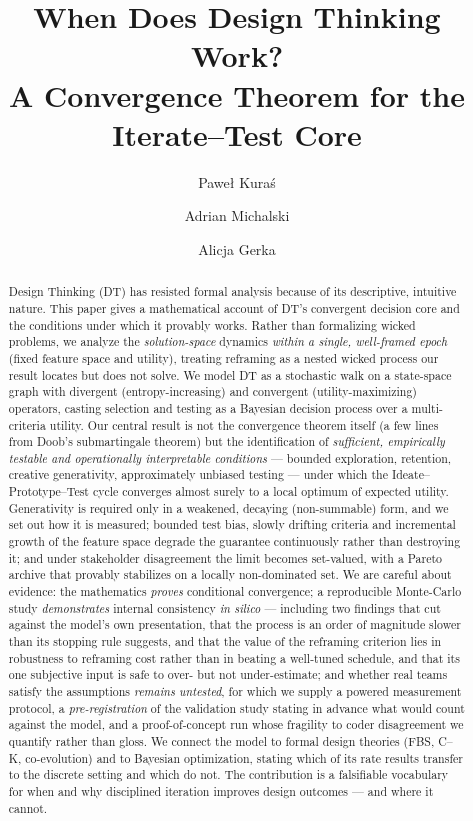 \documentclass[11pt]{article}
\title{\textbf{When Does Design Thinking Work?\\A Convergence Theorem for the Iterate--Test Core}}
\author[1]{Paweł Kuraś}
\author[2]{Adrian Michalski}
\author[3]{Alicja Gerka}
\affil[1]{Institute of Telecommunications, AGH University of Science and Technology, Kraków, Poland}
\affil[2]{Faculty of Mathematics and Applied Sciences, Rzeszów University of Technology, Rzeszów, Poland}
\affil[3]{Department of Complex Systems, Rzeszów University of Technology, Rzeszów, Poland}
\begin{document}
\maketitle

\begin{abstract}
\noindent Design Thinking (DT) has resisted formal analysis because of its descriptive, intuitive nature. This paper gives a mathematical account of DT's convergent decision core and the conditions under which it provably works. Rather than formalizing wicked problems, we analyze the \emph{solution-space} dynamics \emph{within a single, well-framed epoch} (fixed feature space and utility), treating reframing as a nested wicked process our result locates but does not solve. We model DT as a stochastic walk on a state-space graph with divergent (entropy-increasing) and convergent (utility-maximizing) operators, casting selection and testing as a Bayesian decision process over a multi-criteria utility. Our central result is not the convergence theorem itself (a few lines from Doob's submartingale theorem) but the identification of \emph{sufficient, empirically testable and operationally interpretable conditions} --- bounded exploration, retention, creative generativity, approximately unbiased testing --- under which the Ideate--Prototype--Test cycle converges almost surely to a local optimum of expected utility. Generativity is required only in a weakened, decaying (non-summable) form, and we set out how it is measured; bounded test bias, slowly drifting criteria and incremental growth of the feature space degrade the guarantee continuously rather than destroying it; and under stakeholder disagreement the limit becomes set-valued, with a Pareto archive that provably stabilizes on a locally non-dominated set. We are careful about evidence: the mathematics \emph{proves} conditional convergence; a reproducible Monte-Carlo study \emph{demonstrates} internal consistency \emph{in silico} --- including two findings that cut against the model's own presentation, that the process is an order of magnitude slower than its stopping rule suggests, and that the value of the reframing criterion lies in robustness to reframing cost rather than in beating a well-tuned schedule, and that its one subjective input is safe to over- but not under-estimate; and whether real teams satisfy the assumptions \emph{remains untested}, for which we supply a powered measurement protocol, a \emph{pre-registration} of the validation study stating in advance what would count against the model, and a proof-of-concept run whose fragility to coder disagreement we quantify rather than gloss. We connect the model to formal design theories (FBS, C--K, co-evolution) and to Bayesian optimization, stating which of its rate results transfer to the discrete setting and which do not. The contribution is a falsifiable vocabulary for when and why disciplined iteration improves design outcomes --- and where it cannot.
\end{abstract}
\end{document}
